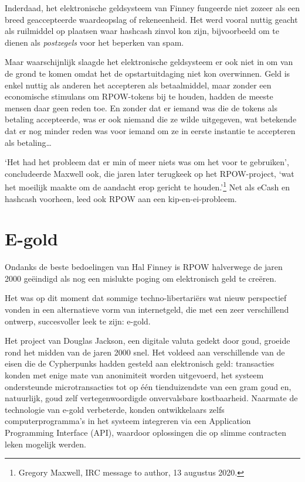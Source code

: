 \documentclass[
  a5paper,
  smalldemyvopaper,11pt,twoside,onecolumn,openright,extrafontsizes,
hidelinks]{memoir}
\begin{document}
Inderdaad, het elektronische geldsysteem van Finney fungeerde niet
zozeer als een breed geaccepteerde waardeopslag of rekeneenheid. Het
werd vooral nuttig geacht als ruilmiddel op plaatsen waar hashcash
zinvol kon zijn, bijvoorbeeld om te dienen als \emph{postzegels} voor
het beperken van spam.

Maar waarschijnlijk slaagde het elektronische geldsysteem er ook niet in
om van de grond te komen omdat het de opstartuitdaging niet kon
overwinnen. Geld is enkel nuttig als anderen het accepteren als
betaalmiddel, maar zonder een economische stimulans om RPOW-tokens bij
te houden, hadden de meeste mensen daar geen reden toe. En zonder dat er
iemand was die de tokens als betaling accepteerde, was er ook niemand
die ze wilde uitgegeven, wat betekende dat er nog minder reden was voor
iemand om ze in eerste instantie te accepteren als betaling\ldots{}

`Het had het probleem dat er min of meer niets was om het voor te
gebruiken', concludeerde Maxwell ook, die jaren later terugkeek op het
RPOW-project, `wat het moeilijk maakte om de aandacht erop gericht te
houden.'\footnote{Gregory Maxwell, IRC message to author, 13 augustus
  2020.} Net als eCash en hashcash voorheen, leed ook RPOW aan een
kip-en-ei-probleem.

\vspace{-1em}

\section{E-gold}\label{e-gold}

Ondanks de beste bedoelingen van Hal Finney is RPOW halverwege de jaren
2000 geëindigd als nog een mislukte poging om elektronisch geld te
creëren.

Het was op dit moment dat sommige techno-libertariërs wat nieuw
perspectief vonden in een alternatieve vorm van internetgeld, die met
een zeer verschillend ontwerp, succesvoller leek te zijn: e-gold.

Het project van Douglas Jackson, een digitale valuta gedekt door goud,
groeide rond het midden van de jaren 2000 snel. Het voldeed aan
verschillende van de eisen die de Cypherpunks hadden gesteld aan
elektronisch geld: transacties konden met enige mate van anonimiteit
worden uitgevoerd, het systeem ondersteunde microtransacties tot op één
tienduizendste van een gram goud en, natuurlijk, goud zelf
vertegenwoordigde onvervalsbare kostbaarheid. Naarmate de technologie
van e-gold verbeterde, konden ontwikkelaars zelfs computerprogramma's in
het systeem integreren via een Application Programming Interface (API),
waardoor oplossingen die op slimme contracten leken mogelijk werden.
\end{document}
